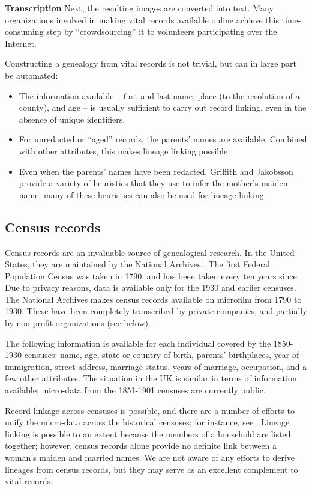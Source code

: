 \documentclass{article}
\begin{document}
{\bf Transcription} Next, the resulting images are converted into text. Many organizations involved in making vital records available online achieve this time-consuming step by ``crowdsourcing'' it to volunteers participating over the Internet.

Constructing a genealogy from vital records is not trivial, but can in large part be automated: 
\begin{itemize}
\item
The information available -- first and last name, place (to the resolution of a county), and age -- is usually sufficient to carry out record linking, even in the absence of unique identifiers.
\item
For unredacted or ``aged'' records, the parents' names are available. Combined with other attributes, this makes lineage linking possible.
\item
Even when the parents' names have been redacted, Griffith and Jakobsson \cite{messing} provide a variety of heuristics that they use to infer the mother's maiden name; many of these heuristics can also be used for lineage linking.
\end{itemize}

\subsection{Census records}

Census records are an invaluable source of genealogical research. In the United States, they are maintained by the National Archives \cite{nara-census}. The first Federal Population Census was taken in 1790, and has been taken every ten years since. Due to privacy reasons, data is available only for the 1930 and earlier censuses. The National Archives makes census records available on microfilm from 1790 to 1930. These have been completely transcribed by private companies, and partially by non-profit organizations (see below).

The following information is available for each individual covered by the 1850-1930 censuses: name, age, state or country of birth, parents' birthplaces, year of immigration, street address, marriage status, years of marriage, occupation, and a few other attributes. The situation in the UK is similar in terms of information available; micro-data from the 1851-1901 censuses are currently public.

Record linkage across censuses is possible, and there are a number of efforts to unify the micro-data across the historical censuses; for instance, see \cite{ipums-usa}. Lineage linking is possible to an extent because the members of a household are listed together; however, census records alone provide no definite link between a woman's maiden and married names. We are not aware of any efforts to derive lineages from census records, but they may serve as an excellent complement to vital records.
\end{document}
